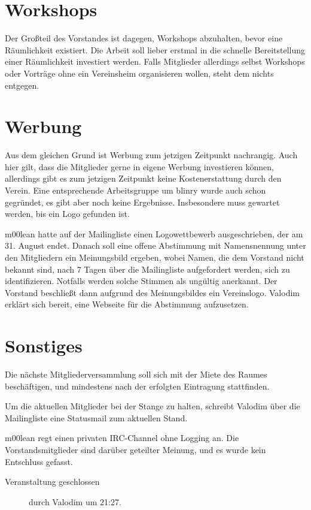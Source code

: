\documentclass[a4paper,12pt]{scrartcl}
\begin{document}
\section{Workshops}
Der Großteil des Vorstandes ist dagegen, Workshops abzuhalten, bevor eine
Räumlichkeit existiert. Die Arbeit soll lieber erstmal in die schnelle
Bereitstellung einer Räumlichkeit investiert werden. Falls Mitglieder
allerdings selbst Workshops oder Vorträge ohne ein Vereinsheim organisieren
wollen, steht dem nichts entgegen.

\section{Werbung}
Aus dem gleichen Grund ist Werbung zum jetzigen Zeitpunkt nachrangig. Auch hier
gilt, dass die Mitglieder gerne in eigene Werbung investieren können,
allerdings gibt es zum jetzigen Zeitpunkt keine Kostenerstattung durch den
Verein. Eine entsprechende Arbeitsgruppe um blinry wurde auch schon
gegründet, es gibt aber noch keine Ergebnisse. Insbesondere muss gewartet
werden, bis ein Logo gefunden ist.

m00lean hatte auf der Mailingliste einen Logowettbewerb ausgeschrieben, der am
31. August endet. Danach soll eine offene Abstimmung mit Namensnennung unter den
Mitgliedern ein Meinungsbild ergeben, wobei Namen, die dem Vorstand nicht
bekannt sind, nach 7 Tagen über die Mailingliste aufgefordert werden, sich zu
identifizieren. Notfalls werden solche Stimmen als ungültig anerkannt. Der
Vorstand beschließt dann aufgrund des Meinungsbildes ein Vereinslogo. Valodim
erklärt sich bereit, eine Webseite für die Abstimmung aufzusetzen.

\section{Sonstiges}
Die nächste Mitgliederversammlung soll sich mit der Miete des Raumes
beschäftigen, und mindestens nach der erfolgten Eintragung stattfinden.

Um die aktuellen Mitglieder bei der Stange zu halten, schreibt Valodim über die
Mailingliste eine Statusmail zum aktuellen Stand.

m00lean regt einen privaten IRC-Channel ohne Logging an. Die
Vorstandsmitglieder sind darüber geteilter Meinung, und es wurde kein
Entschluss gefasst.

\begin{description}
 \item[Veranstaltung geschlossen] durch Valodim um 21:27.
\end{description}
\end{document}
